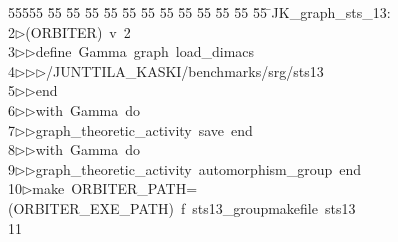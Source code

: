 %
%
\begin{tabbing}
55555 \= 55 \= 55 \= 55 \= 55 \= 55 \= 55 \= 55 \= 55 \= 55 \= 55 \= 55 \= 55 \= \>JK\_graph\_sts\_13:\\[0pt]
2\>$\triangleright$\>(ORBITER)\ v\ 2\ \\[0pt]
3\>$\triangleright$\>$\triangleright$\>define\ Gamma\ graph\ load\_dimacs\ \\[0pt]
4\>$\triangleright$\>$\triangleright$\>$\triangleright$\>/JUNTTILA\_KASKI/benchmarks/srg/sts13\ \\[0pt]
5\>$\triangleright$\>$\triangleright$\>end\ \\[0pt]
6\>$\triangleright$\>$\triangleright$\>with\ Gamma\ do\ \\[0pt]
7\>$\triangleright$\>$\triangleright$\>graph\_theoretic\_activity\ save\ end\ \\[0pt]
8\>$\triangleright$\>$\triangleright$\>with\ Gamma\ do\ \\[0pt]
9\>$\triangleright$\>$\triangleright$\>graph\_theoretic\_activity\ automorphism\_group\ end\\[0pt]
10\>$\triangleright$\>make\ ORBITER\_PATH=(ORBITER\_EXE\_PATH)\ f\ sts13\_groupmakefile\ sts13\\[0pt]
11\>\end{tabbing}
